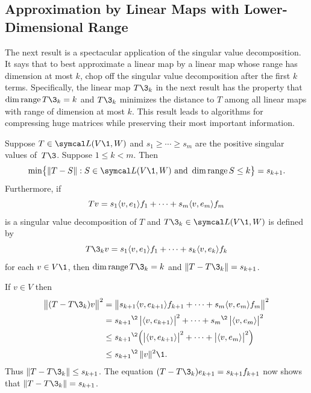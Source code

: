 \vspace{-.02in} %

\subsection{Approximation by Linear Maps with Lower-Dimensional Range}

The next result is a spectacular application of the singular value decomposition. It says that to best approximate a linear map by a linear map whose range has dimension at most $k$, chop off the singular value decomposition after the first $k$ terms. Specifically, the linear map $T\3_k$ in the next result has the property that $\dim \ran T\3_k = k$ and $T\3_k$ minimizes the distance to $T$ among all linear maps with range of dimension at most $k$. This result leads to algorithms for compressing huge matrices while preserving their most important information.

\pagebreak[3]

{Suppose $T \in \L(V\1, W)$ and $s_1 \ge \cdots \ge s_m$ are the positive singular values of~$T\3$. Suppose
$1 \le k < m$. Then
\[
\min \br[\big]{ \norm{T-S} : S \in \L(V\1, W) \text{ and } \dim \ran S \le k} = s_{k+1}.
\]
Furthermore, if
\vspace{-.1in} %
\[
Tv = s_1 \langle v, e_1\rangle f_1 + \cdots + s_m \langle v, e_m\rangle f_m
\]
is a singular value decomposition of $T$ and $T\3_k \in \L(V\1,W)$ is defined by
\[
T\3_k v = s_1 \ip{v, e_1} f_1 + \cdots + s_k \ip{v, e_k} f_k
\]
for each $v \in V\1$, then $\dim \ran T\3_k = k$ and $\norm{T-T\3_k} = s_{k+1}$.}

\proof
If $v \in V$ then
\begin{align*}
\norm[\big]{(T-T\3_k)v}^2 &= \norm[\big]{s_{k+1} \ip{v, e_{k+1}} f_{k+1} + \cdots + s_m \ip{v, e_m} f_m}^2 \\[1bp]
&= {s_{k+1}}^{\2} \, \abs[\big]{\ip{v, e_{k+1}}}^2 + \cdots +{s_m}^{\2} \, \abs[\big]{\ip{v, e_m}}^2 \\[1bp]
&\le {s_{k+1}}^{\2} \paren[\Big]{ \abs[\big]{ \ip{v, e_{k+1}} }^2 + \cdots + \abs[\big]{ \ip{v, e_m} }^2 } \\[1bp]
&\le {s_{k+1}}^{\2} \, \norm{v}^2\1.
\end{align*}
Thus $\norm{T - T\3_k} \le s_{k+1}$. The equation $(T - T\3_k)e_{k+1} = s_{k+1} f_{k+1}$ now shows that $\norm{T - T\3_k} = s_{k+1}$.

